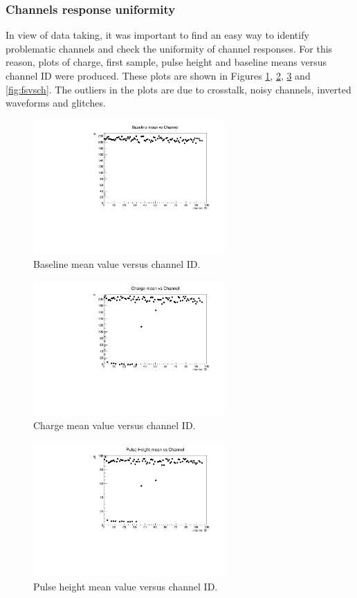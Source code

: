 \subsubsection{Channels response uniformity}
In view of data taking, it was important to find an easy way to identify problematic channels and check the uniformity of channel responses. 
For this reason, plots of charge, first sample, pulse height and baseline means versus channel ID were produced. 
These plots are shown in Figures \ref{fig:blvsch}, \ref{fig:qvsch}, \ref{fig:phvsch} and \ref{fig:fsvsch}. 
The outliers in the plots are due to crosstalk, noisy channels, inverted waveforms and glitches.
\begin{figure}[!h]
  \centering
  \includegraphics[width=0.65\textwidth]{figures/pdf/bl_vs_ch1.pdf}
  \caption{Baseline mean value versus channel ID.}
  \label{fig:blvsch}
\end{figure}
\begin{figure}[!h]
  \centering
  \includegraphics[width=0.65\textwidth]{figures/pdf/q_vs_ch1.pdf}
  \caption{Charge mean value versus channel ID.}
  \label{fig:qvsch}
\end{figure}
\begin{figure}[!h]
  \centering
  \includegraphics[width=0.65\textwidth]{figures/pdf/ph_vs_ch1.pdf}
  \caption{Pulse height mean value versus channel ID.}
  \label{fig:phvsch}
\end{figure}
